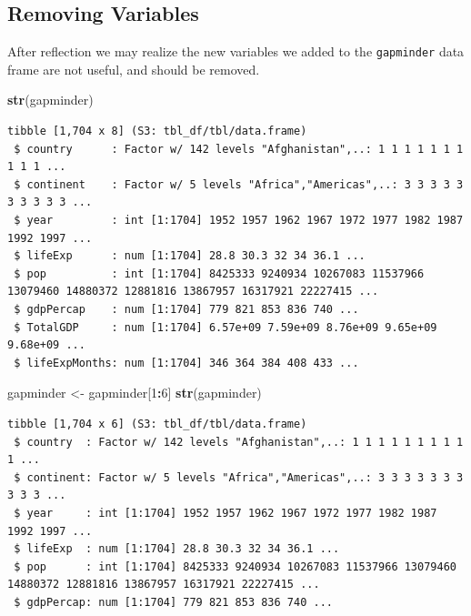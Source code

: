 \documentclass[
]{krantz}
\makeatletter
\newenvironment{Shaded}{\begin{snugshade}}{\end{snugshade}}
\newcommand{\DecValTok}[1]{\textcolor[rgb]{0.06,0.06,0.06}{#1}}
\newcommand{\KeywordTok}[1]{\textcolor[rgb]{0.27,0.27,0.27}{\textbf{#1}}}
\newcommand{\NormalTok}[1]{#1}
\newcommand{\OperatorTok}[1]{\textcolor[rgb]{0.43,0.43,0.43}{\textbf{#1}}}
\newcommand{\StringTok}[1]{\textcolor[rgb]{0.5,0.5,0.5}{#1}}
\newenvironment{kframe}{%
\medskip{}
\setlength{\fboxsep}{.8em}
 \def\at@end@of@kframe{}%
 \ifinner\ifhmode%
  \def\at@end@of@kframe{\end{minipage}}%
  \begin{minipage}{\columnwidth}%
 \fi\fi%
 \def\FrameCommand##1{\hskip\@totalleftmargin \hskip-\fboxsep
 \colorbox{shadecolor}{##1}\hskip-\fboxsep
     \hskip-\linewidth \hskip-\@totalleftmargin \hskip\columnwidth}%
 \MakeFramed {\advance\hsize-\width
   \@totalleftmargin\z@ \linewidth\hsize
   \@setminipage}}%
 {\par\unskip\endMakeFramed%
 \at@end@of@kframe}
\renewenvironment{Shaded}{\begin{kframe}}{\end{kframe}}
\makeatother
\begin{document}
\hypertarget{removing-variables}{%
\subsection{Removing Variables}\label{removing-variables}}

After reflection we may realize the new variables we added to the \texttt{gapminder} data frame are not useful, and should be removed.

\begin{Shaded}
\begin{Highlighting}[]
\KeywordTok{str}\NormalTok{(gapminder)}
\end{Highlighting}
\end{Shaded}

\begin{verbatim}
tibble [1,704 x 8] (S3: tbl_df/tbl/data.frame)
 $ country      : Factor w/ 142 levels "Afghanistan",..: 1 1 1 1 1 1 1 1 1 1 ...
 $ continent    : Factor w/ 5 levels "Africa","Americas",..: 3 3 3 3 3 3 3 3 3 3 ...
 $ year         : int [1:1704] 1952 1957 1962 1967 1972 1977 1982 1987 1992 1997 ...
 $ lifeExp      : num [1:1704] 28.8 30.3 32 34 36.1 ...
 $ pop          : int [1:1704] 8425333 9240934 10267083 11537966 13079460 14880372 12881816 13867957 16317921 22227415 ...
 $ gdpPercap    : num [1:1704] 779 821 853 836 740 ...
 $ TotalGDP     : num [1:1704] 6.57e+09 7.59e+09 8.76e+09 9.65e+09 9.68e+09 ...
 $ lifeExpMonths: num [1:1704] 346 364 384 408 433 ...
\end{verbatim}

\begin{Shaded}
\begin{Highlighting}[]
\NormalTok{gapminder \textless{}{-}}\StringTok{ }\NormalTok{gapminder[}\DecValTok{1}\OperatorTok{:}\DecValTok{6}\NormalTok{]}
\KeywordTok{str}\NormalTok{(gapminder)}
\end{Highlighting}
\end{Shaded}

\begin{verbatim}
tibble [1,704 x 6] (S3: tbl_df/tbl/data.frame)
 $ country  : Factor w/ 142 levels "Afghanistan",..: 1 1 1 1 1 1 1 1 1 1 ...
 $ continent: Factor w/ 5 levels "Africa","Americas",..: 3 3 3 3 3 3 3 3 3 3 ...
 $ year     : int [1:1704] 1952 1957 1962 1967 1972 1977 1982 1987 1992 1997 ...
 $ lifeExp  : num [1:1704] 28.8 30.3 32 34 36.1 ...
 $ pop      : int [1:1704] 8425333 9240934 10267083 11537966 13079460 14880372 12881816 13867957 16317921 22227415 ...
 $ gdpPercap: num [1:1704] 779 821 853 836 740 ...
\end{verbatim}
\end{document}
